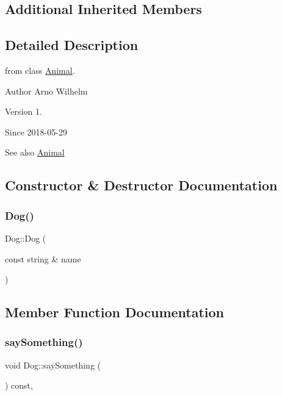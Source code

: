 \subsection*{Additional Inherited Members}


\subsection{Detailed Description}
from class \hyperlink{classAnimal}{Animal}.

\begin{DoxyAuthor}{Author}
Arno Wilhelm 
\end{DoxyAuthor}
\begin{DoxyVersion}{Version}
1. 
\end{DoxyVersion}
\begin{DoxySince}{Since}
2018-\/05-\/29 
\end{DoxySince}
\begin{DoxySeeAlso}{See also}
\hyperlink{classAnimal}{Animal} 
\end{DoxySeeAlso}


\subsection{Constructor \& Destructor Documentation}
\mbox{\label{classDog_ad68949296d9449aa7d290e6f07d92787}} 
\subsubsection{\texorpdfstring{Dog()}{Dog()}}
{\footnotesize\ttfamily Dog\+::\+Dog (\begin{DoxyParamCaption}\item[{const string \&}]{name }\end{DoxyParamCaption})\hspace{0.3cm}{\ttfamily [inline]}}



\subsection{Member Function Documentation}
\mbox{\label{classDog_aa76235fa1a137f2fccf5138e5b92d0b3}} 
\subsubsection{\texorpdfstring{say\+Something()}{saySomething()}}
{\footnotesize\ttfamily void Dog\+::say\+Something (\begin{DoxyParamCaption}{ }\end{DoxyParamCaption}) const\hspace{0.3cm}{\ttfamily [inline]}, {\ttfamily [virtual]}}

